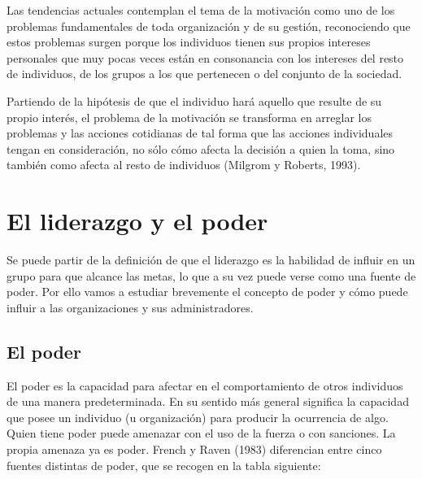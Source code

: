 \documentclass[
]{krantz}
\begin{document}
Las tendencias actuales contemplan el tema de la motivación como uno de los problemas fundamentales de toda organización y de su gestión, reconociendo que estos problemas surgen porque los individuos tienen sus propios intereses personales que muy pocas veces están en consonancia con los intereses del resto de individuos, de los grupos a los que pertenecen o del conjunto de la sociedad.

Partiendo de la hipótesis de que el individuo hará aquello que resulte de su propio interés, el problema de la motivación se transforma en arreglar los problemas y las acciones cotidianas de tal forma que las acciones individuales tengan en consideración, no sólo cómo afecta la decisión a quien la toma, sino también como afecta al resto de individuos (Milgrom y Roberts, 1993).

\hypertarget{el-liderazgo-y-el-poder}{%
\section{El liderazgo y el poder}\label{el-liderazgo-y-el-poder}}

Se puede partir de la definición de que el liderazgo es la habilidad de influir en un grupo para que alcance las metas, lo que a su vez puede verse como una fuente de poder. Por ello vamos a estudiar brevemente el concepto de poder y cómo puede influir a las organizaciones y sus administradores.

\hypertarget{el-poder}{%
\subsection{El poder}\label{el-poder}}

El poder es la capacidad para afectar en el comportamiento de otros individuos de una manera predeterminada. En su sentido más general significa la capacidad que posee un individuo (u organización) para producir la ocurrencia de algo. Quien tiene poder puede amenazar con el uso de la fuerza o con sanciones. La propia amenaza ya es poder.
French y Raven (1983) diferencian entre cinco fuentes distintas de poder, que se recogen en la tabla siguiente:
\end{document}
